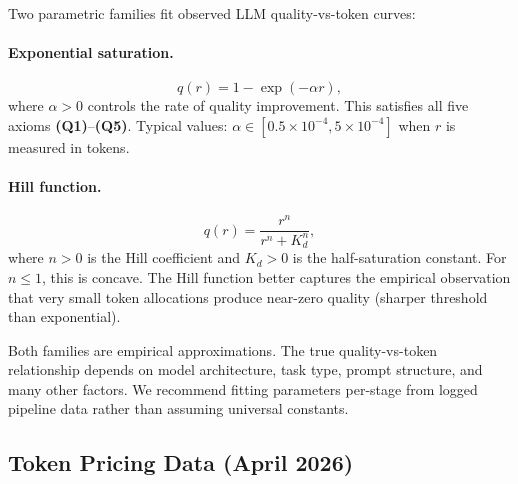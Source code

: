 \documentclass[11pt, a4paper, copyright]{googledeepmind}
\begin{document}
Two parametric families fit observed LLM quality-vs-token curves:

\paragraph{Exponential saturation.}
\begin{equation}\label{eq:exp-sat}
    q(r) = 1 - \exp(-\alpha r),
\end{equation}
where $\alpha > 0$ controls the rate of quality improvement. This satisfies all five axioms \textbf{(Q1)}--\textbf{(Q5)}. Typical values: $\alpha \in [0.5 \times 10^{-4}, 5 \times 10^{-4}]$ when $r$ is measured in tokens.

\paragraph{Hill function.}
\begin{equation}\label{eq:hill}
    q(r) = \frac{r^n}{r^n + K_d^n},
\end{equation}
where $n > 0$ is the Hill coefficient and $K_d > 0$ is the half-saturation constant. For $n \leq 1$, this is concave. The Hill function better captures the empirical observation that very small token allocations produce near-zero quality (sharper threshold than exponential).

Both families are empirical approximations. The true quality-vs-token relationship depends on model architecture, task type, prompt structure, and many other factors. We recommend fitting parameters per-stage from logged pipeline data rather than assuming universal constants.

\subsection{Token Pricing Data (April 2026)}
\end{document}
